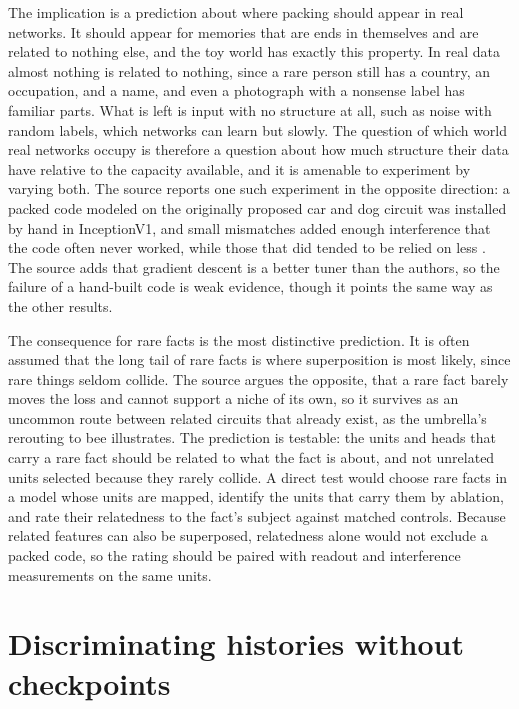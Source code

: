 \documentclass[11pt]{article}
\begin{document}
The implication is a prediction about where packing should appear in real networks. It should appear for memories that are ends in themselves and are related to nothing else, and the toy world has exactly this property. In real data almost nothing is related to nothing, since a rare person still has a country, an occupation, and a name, and even a photograph with a nonsense label has familiar parts. What is left is input with no structure at all, such as noise with random labels, which networks can learn \cite{zhang2017} but slowly. The question of which world real networks occupy is therefore a question about how much structure their data have relative to the capacity available, and it is amenable to experiment by varying both. The source reports one such experiment in the opposite direction: a packed code modeled on the originally proposed car and dog circuit was installed by hand in InceptionV1, and small mismatches added enough interference that the code often never worked, while those that did tended to be relied on less \cite[\emph{More on Circuit Ecology}]{cammarata}. The source adds that gradient descent is a better tuner than the authors, so the failure of a hand-built code is weak evidence, though it points the same way as the other results.

The consequence for rare facts is the most distinctive prediction. It is often assumed that the long tail of rare facts is where superposition is most likely, since rare things seldom collide. The source argues the opposite, that a rare fact barely moves the loss and cannot support a niche of its own, so it survives as an uncommon route between related circuits that already exist, as the umbrella's rerouting to bee illustrates. The prediction is testable: the units and heads that carry a rare fact should be related to what the fact is about, and not unrelated units selected because they rarely collide. A direct test would choose rare facts in a model whose units are mapped, identify the units that carry them by ablation, and rate their relatedness to the fact's subject against matched controls. Because related features can also be superposed, relatedness alone would not exclude a packed code, so the rating should be paired with readout and interference measurements on the same units.

\section{Discriminating histories without checkpoints}
\end{document}
